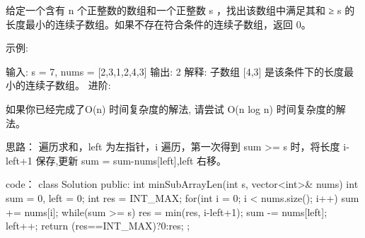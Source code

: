 给定一个含有 n 个正整数的数组和一个正整数 s ，找出该数组中满足其和 ≥ s 的长度最小的连续子数组。如果不存在符合条件的连续子数组，返回 0。

示例: 

输入: s = 7, nums = [2,3,1,2,4,3]
输出: 2
解释: 子数组 [4,3] 是该条件下的长度最小的连续子数组。
进阶:

如果你已经完成了O(n) 时间复杂度的解法, 请尝试 O(n log n) 时间复杂度的解法。




























思路：
遍历求和，left 为左指针，i 遍历，第一次得到 sum >= s 时，将长度 i-left+1 保存,更新 sum = sum-nums[left],left 右移。


























code：
class Solution {
public:
    int minSubArrayLen(int s, vector<int>& nums) {
        int sum = 0, left = 0;
        int res = INT_MAX;
        for(int i = 0; i < nums.size(); i++)
        {
            sum += nums[i];
            while(sum >= s)
            {
                res = min(res, i-left+1);
                sum -= nums[left];
                left++;
            }
        }
        return (res==INT_MAX)?0:res;
    }
};
